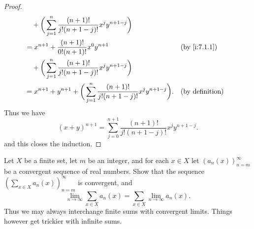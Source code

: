 \begin{proof}
\begin{align*}
     & \quad + \bigg(\sum_{j = 1}^n \dfrac{(n + 1)!}{j!(n + 1 - j)!} x^j y^{n + 1 - j}\bigg)                                                                     \\
     & = x^{n + 1} + \dfrac{(n + 1)!}{0! (n + 1)!} x^0 y^{n + 1}                                                                     &  & \by{i:7.1.1}           \\
     & \quad + \bigg(\sum_{j = 1}^n \dfrac{(n + 1)!}{j!(n + 1 - j)!} x^j y^{n + 1 - j}\bigg)                                                                     \\
     & = x^{n + 1} + y^{n + 1} + \bigg(\sum_{j = 1}^n \dfrac{(n + 1)!}{j!(n + 1 - j)!} x^j y^{n + 1 - j}\bigg).                      &  & \text{(by definition)}
  \end{align*}
  Thus we have
  \[
    (x + y)^{n + 1} = \sum_{j = 0}^{n + 1} \dfrac{(n + 1)!}{j!(n + 1 - j)!} x^j y^{n + 1 - j}.
  \]
  and this closes the induction.
\end{proof}

\begin{ex}\label{i:ex:7.1.5}
  Let \(X\) be a finite set, let \(m\) be an integer, and for each \(x \in X\) let \((a_n(x))_{n = m}^\infty\) be a convergent sequence of real numbers.
  Show that the sequence \((\sum_{x \in X} a_n(x))_{n = m}^\infty\) is convergent, and
  \[
    \lim_{n \to \infty} \sum_{x \in X} a_n(x) = \sum_{x \in X} \lim_{n \to \infty} a_n(x).
  \]
  Thus we may always interchange finite sums with convergent limits.
  Things however get trickier with infinite sums.
\end{ex}

